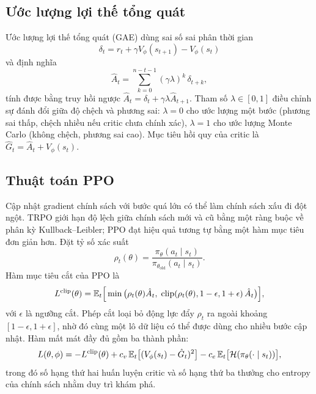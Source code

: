 \subsection{Ước lượng lợi thế tổng quát}

Ước lượng lợi thế tổng quát (GAE) \cite{schulman2016} dùng sai số sai phân thời gian
\begin{equation}
\delta_t=r_t+\gamma V_\phi(s_{t+1})-V_\phi(s_t)
\end{equation}
và định nghĩa
\begin{equation}
\hat A_t=\sum_{k=0}^{n-t-1}(\gamma\lambda)^{k}\,\delta_{t+k},
\label{eq:gae}
\end{equation}
tính được bằng truy hồi ngược $\hat A_t=\delta_t+\gamma\lambda\hat A_{t+1}$. Tham số $\lambda\in[0,1]$ điều chỉnh sự đánh đổi giữa độ chệch và phương sai: $\lambda=0$ cho ước lượng một bước (phương sai thấp, chệch nhiều nếu critic chưa chính xác), $\lambda=1$ cho ước lượng Monte Carlo (không chệch, phương sai cao). Mục tiêu hồi quy của critic là $\hat G_t=\hat A_t+V_\phi(s_t)$.

\subsection{Thuật toán PPO}

Cập nhật gradient chính sách với bước quá lớn có thể làm chính sách xấu đi đột ngột. TRPO \cite{schulman2015} giới hạn độ lệch giữa chính sách mới và cũ bằng một ràng buộc về phân kỳ Kullback--Leibler; PPO \cite{schulman2017} đạt hiệu quả tương tự bằng một hàm mục tiêu đơn giản hơn. Đặt tỷ số xác suất
\begin{equation}
\rho_t(\theta)=\frac{\pi_\theta(a_t\mid s_t)}{\pi_{\theta_{\mathrm{old}}}(a_t\mid s_t)} .
\end{equation}
Hàm mục tiêu cắt của PPO là
\begin{equation}
L^{\mathrm{clip}}(\theta)=\mathbb{E}_t\Big[\min\big(\rho_t(\theta)\hat A_t,\;\operatorname{clip}(\rho_t(\theta),1-\epsilon,1+\epsilon)\,\hat A_t\big)\Big],
\label{eq:ppo-clip}
\end{equation}
với $\epsilon$ là ngưỡng cắt. Phép cắt loại bỏ động lực đẩy $\rho_t$ ra ngoài khoảng $[1-\epsilon,1+\epsilon]$, nhờ đó cùng một lô dữ liệu có thể được dùng cho nhiều bước cập nhật. Hàm mất mát đầy đủ gồm ba thành phần:
\begin{equation}
L(\theta,\phi)=-L^{\mathrm{clip}}(\theta)+c_v\,\mathbb{E}_t\big[(V_\phi(s_t)-\hat G_t)^2\big]-c_e\,\mathbb{E}_t\big[\mathcal{H}(\pi_\theta(\cdot\mid s_t))\big],
\label{eq:ppo-loss}
\end{equation}
trong đó số hạng thứ hai huấn luyện critic và số hạng thứ ba thưởng cho entropy của chính sách nhằm duy trì khám phá.

